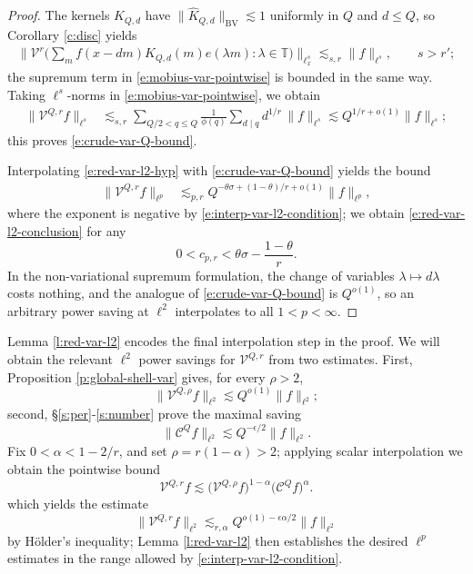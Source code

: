 \documentclass[12pt]{amsart}
\numberwithin{equation}{section}
\theoremstyle{definition}
\begin{document}
\begin{proof}
The kernels \(K_{Q,d}\) have $\| \widehat{K}_{Q,d} \|_{\text{BV}} \lesssim 1$ uniformly in
\(Q\) and \(d\leq Q\), so Corollary \ref{c:disc} yields
\begin{align}
    \Big\|
    \mathcal{V}^r\big(
    \sum_m f(x-dm)K_{Q,d}(m)e(\lambda m):\lambda\in\mathbb T
    \big)
    \Big\|_{\ell^s_x}
    \lesssim_{s,r}
    \|f\|_{\ell^s},
    \qquad s>r';
\end{align}
the supremum term in \eqref{e:mobius-var-pointwise} is bounded in the same way. Taking \(\ell^s\)-norms in \eqref{e:mobius-var-pointwise}, we obtain
\begin{align}
    \|\mathcal V^{Q,r}f\|_{\ell^s}
    &\lesssim_{s,r}
    \sum_{Q/2<q\leq Q}
    \frac1{\phi(q)}
    \sum_{d\mid q}d^{1/r}\,
    \|f\|_{\ell^s} \lesssim Q^{1/r + o(1)} \|f \|_{\ell^s};
\end{align}
this proves \eqref{e:crude-var-Q-bound}.

Interpolating \eqref{e:red-var-l2-hyp} with \eqref{e:crude-var-Q-bound} yields the bound
\begin{align}
    \|\mathcal V^{Q,r}f\|_{\ell^p}
    &\lesssim_{p,r}
    Q^{-\theta\sigma+(1-\theta)/r+o(1)}
    \|f\|_{\ell^p},
\end{align}
where the exponent is negative by \eqref{e:interp-var-l2-condition}; we obtain
\eqref{e:red-var-l2-conclusion} for any
\[
    0<c_{p,r}<\theta\sigma-\frac{1-\theta}{r}.
\]
In the non-variational supremum formulation, the change of variables
\(\lambda\mapsto d\lambda\) costs nothing, and the analogue of
\eqref{e:crude-var-Q-bound} is \(Q^{o(1)}\), so an arbitrary power saving at
\(\ell^2\) interpolates to all \(1<p<\infty\).
\end{proof}

Lemma \ref{l:red-var-l2} encodes the final interpolation step in the proof. We will obtain the relevant $\ell^2$ power savings for $\mathcal{V}^{Q,r}$ from two estimates. First, 
Proposition \ref{p:global-shell-var} gives, for every $\rho>2$,
\[
    \|\mathcal V^{Q,\rho} f\|_{\ell^2}
    \lesssim
    Q^{o(1)}\|f\|_{\ell^2};
\]
second, \S \ref{s:per}-\ref{s:number} prove the maximal saving
\[
    \|\mathcal C^Q f\|_{\ell^2}
    \lesssim Q^{-\epsilon/2}\|f\|_{\ell^2}.
\]
Fix \(0<\alpha<1-2/r\), and set \(\rho=r(1-\alpha)>2\); applying scalar interpolation we obtain the pointwise bound
\[
    \mathcal V^{Q,r}f
    \lesssim
    \big(\mathcal V^{Q,\rho}f\big)^{1-\alpha}
    \big(\mathcal C^Q f\big)^\alpha.
\]
which yields the estimate
\[
    \|\mathcal V^{Q,r} f\|_{\ell^2}
    \lesssim_{r,\alpha}
    Q^{o(1)-\epsilon\alpha/2}\|f\|_{\ell^2}
\]
by H\"{o}lder's inequality; Lemma \ref{l:red-var-l2} then establishes 
the desired \(\ell^p\) estimates in the range allowed by \eqref{e:interp-var-l2-condition}.
\end{document}
